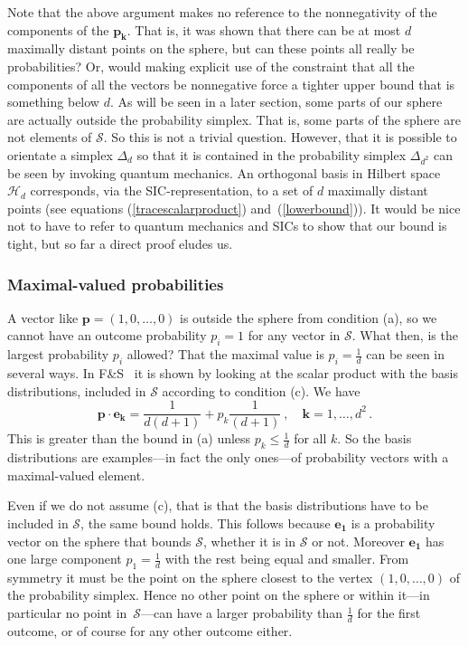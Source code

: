 \documentclass[letterpaper,11pt]{article}
\begin{document}
Note that the above argument makes no reference to the nonnegativity of the components of the $\mathbf{p_k}$.  That is, it was shown that there can be at most $d$ maximally distant points on the sphere, but can these points all really be probabilities?  Or, would making explicit use of the constraint that all the components of all the vectors be nonnegative force a tighter upper bound that is something below $d$.  As will be seen in a later section, some parts of our sphere are actually outside the probability simplex. That is, some parts of the sphere are not elements of $\mathcal S$. So this is not a trivial question.  However, that it is possible to orientate a simplex $\Delta_d$ so that it is contained in the probability simplex $\Delta_{d^2}$ can be seen by invoking quantum mechanics. An orthogonal basis in Hilbert space $\mathcal H_d$ corresponds, via the SIC-representation, to a set of $d$ maximally distant points (see equations (\ref{tracescalarproduct}) and~(\ref{lowerbound})). It would be nice not to have to refer to quantum mechanics and SICs to show that our bound is tight, but so far a direct proof eludes us.


\subsubsection{Maximal-valued probabilities} %

\indent \indent
A vector like $\mathbf p=(1,0,\dots,0)$ is outside the sphere from condition (a), so we cannot have an outcome probability $p_i=1$ for any vector in $\mathcal S$. What then, is the largest probability $p_i$ allowed? That the maximal value is $p_i=\frac{1}{d}$ can be seen in several ways. In F\&S~\cite{Fuchs&Schack} it is shown by looking at the scalar product with the basis distributions, included in $\mathcal S$ according to condition (c). We have
%
\begin{equation}
   \mathbf{p\cdot e_k} = \frac{1}{d(d+1)}+ p_k \frac{1}{(d+1)}  \ , \quad \mathbf{k}=1,\dots,d^2 \, .
\end{equation}
%
This is greater than the bound in (a) unless $p_k\leq \frac{1}{d}$ for all $k$. So the basis distributions are examples---in fact the only ones---of probability vectors with a maximal-valued element.

Even if we do not assume (c), that is that the basis distributions have to be included in $\mathcal S$, the same bound holds. This follows because $\mathbf{e_1}$ is a probability vector on the sphere that bounds $\mathcal S$, whether it is in $\mathcal S$ or not. Moreover $\mathbf{e_1}$ has one large component $p_1= \frac{1}{d}$ with the rest being equal and smaller. From symmetry it must be the point on the sphere closest to the vertex $(1,0,\dots,0)$ of the probability simplex. Hence no other point on the sphere or within it---in particular no point in~$\mathcal S$---can have a larger probability than $ \frac{1}{d}$ for the first outcome, or of course for any other outcome either.
\end{document}
